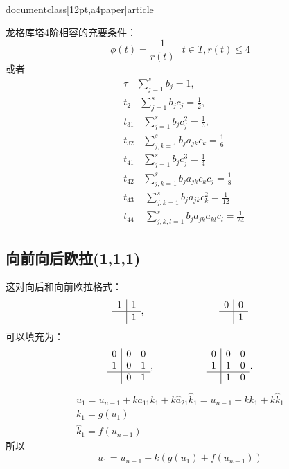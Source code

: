 \\documentclass[12pt,a4paper]{article}
\begin{document}
龙格库塔4阶相容的充要条件：
\begin{equation*}
\phi(t)=\frac{1}{r(t)} ~~~t\in T,r(t)\le 4
\end{equation*}
或者
\begin{align*}
&\tau~~~~\sum_{j=1}^{s}b_{j}=1,\\
&t_{2}~~~~\sum_{j=1}^{s}b_{j}c_{j}=\frac{1}{2},\\
&t_{31}~~~~\sum_{j=1}^{s}b_{j}c_{j}^2=\frac{1}{3},\\
&t_{32}~~~~\sum_{j,k=1}^{s}b_{j}a_{jk}c_{k}=\frac{1}{6}\\
&t_{41}~~~~\sum_{j=1}^{s}b_{j}c_{j}^3=\frac{1}{4}\\
&t_{42}~~~~\sum_{j,k=1}^{s}b_{j}a_{jk}c_{k}c_{j}=\frac{1}{8}\\
&t_{43}~~~~~\sum_{j,k=1}^{s}b_{j}a_{jk}c_{k}^2=\frac{1}{12}\\
&t_{44}~~~~~\sum_{j,k,l=1}^{s}b_{j}a_{jk}a_{kl}c_{l}=\frac{1}{24}
\end{align*}
\subsection{向前向后欧拉(1,1,1)}

这对向后和向前欧拉格式：
\[
\begin{array}{r|r}
1 & 1 \\
\hline
& 1
\end{array},~~~~~~~~~~~~~~~~~~~~~~~
\begin{array}{r|r}
0 & 0 \\
\hline
& 1 
\end{array}
\]
可以填充为：
\[
\begin{array}{r|rr}
0 & 0 & 0 \\
1 & 0 & 1 \\
\hline
& 0 & 1
\end{array},~~~~~~~~~~~~~~~~
\begin{array}{r|rr}
0 & 0 & 0\\
1 & 1 & 0\\
\hline
& 1 & 0
\end{array}.
\]
\begin{gather*}
u_{1}=u_{n-1}+ka_{11}k_{1}+k\hat{a}_{21}\hat{k}_{1}=u_{n-1}+k k_{1}+k \hat{k}_{1}\\
k_{1}=g(u_{1})\\
\hat{k}_{1}=f(u_{n-1})
\end{gather*}
所以
\begin{equation*}
u_{1}=u_{n-1}+k(g(u_{1})+f(u_{n-1}))
\end{equation*}
\end{document}
